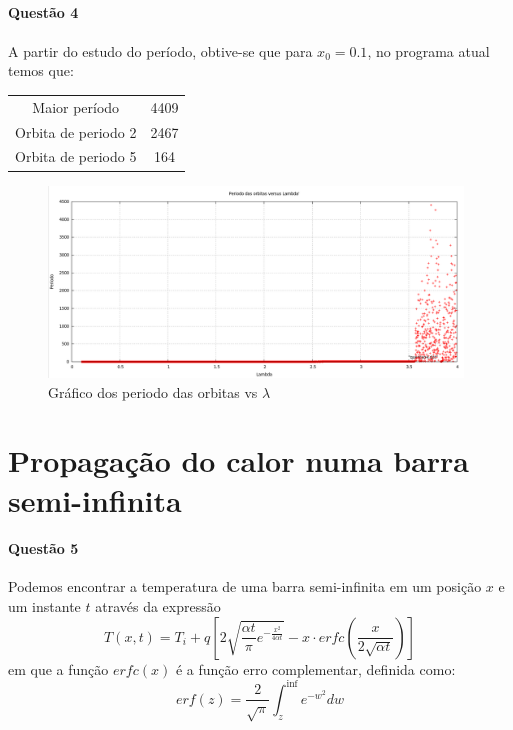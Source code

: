 \documentclass[a4paper,11pt]{article}
\begin{document}
\paragraph{Questão 4}
\paragraph{}A partir do estudo do período, obtive-se que para $x_0 = 0.1$, no programa atual temos que:
\begin{table}[H]
\centering
\begin{tabular}{cc}
\hline
Maior período & 4409\\
Orbita de periodo 2 & 2467\\
Orbita de periodo 5 & 164\\
\hline
\end{tabular}
\end{table}
\begin{figure}[H]
\includegraphics[width=11cm]{../image/questao4.png}
\centering
\caption{Gráfico dos periodo das orbitas vs $\lambda$}
\end{figure}

\section{Propagação do calor numa barra semi-infinita}
\paragraph{Questão 5}Podemos encontrar a temperatura de uma barra semi-infinita em um posição $x$ e um instante $t$ através da expressão
\begin{equation}\label{eqTemp}
T(x,t) = T_i + q\left[2\sqrt{\frac{\alpha t}{\pi}e^{-\frac{x^2}{4\alpha t}}} - x\cdot erfc\left( \frac{x}{2\sqrt{\alpha t}}\right)\right]
\end{equation}
em que a função $erfc(x)$ é a função erro complementar, definida como:
\begin{equation}\label{eqErfc}
erf(z) = \frac{2}{\sqrt{\pi}}\int_{z}^{\inf}{e^{-w^2}dw}
\end{equation}
\end{document}

